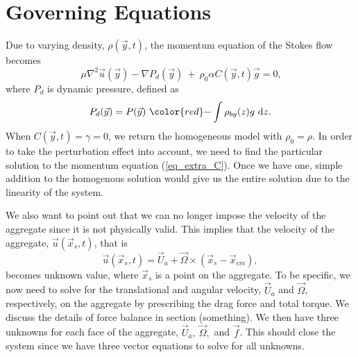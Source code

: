 \section{Governing Equations}
	Due to varying density, $\rho(\vec{y}, t)$, 
the momentum equation of the Stokes flow becomes
		 \begin{equation}
		\ \mu \nabla^2 \vec{u}(\vec{y})
		- \nabla P_d (\vec{y}) \ + \  
		 \rho_0 \alpha C(\vec{y},t) \vec{g} =0 , 
	\label{eq_extra_C}
	\end{equation}
	where $P_d$ is dynamic pressure, defined as
\begin{equation}
	P_d (\vec{y})
	 = P (\vec{y}) \ {\color{red}-} \int \rho_{bg}(z) g  \ \textrm{d}z.
	\label{eq_Pd}
\end{equation}
	When $C(\vec{y}, t)= \gamma = 0$, we return the homogeneous model with $\rho_0 = \rho$. 
	 In order to take the perturbation effect into account, we need to find the particular solution to the momentum equation (\ref{eq_extra_C}). Once we have one, simple addition to the homogenous solution would give us the entire solution due to the linearity of the system. 
\par
We also want to point out that we can no longer impose the velocity of the aggregate since it is not physically valid.
This implies that the velocity of the aggregate, $\vec{u}(\vec{x}_s, t)$, that is
\begin{equation}
	\vec{u} (\vec{x}_s, t)  = \vec{U}_a + \vec{\Omega} \times (\vec{x}_s - \vec{x}_{cm}),
\end{equation}
becomes unknown value, where $\vec{x}_s$ is a point on the aggregate. To be specific, we now need to solve for the translational and angular velocity, $\vec{U}_a$ and $\vec{\Omega}$, respectively, on the aggregate by prescribing the drag force and total torque. We discuss the details of force balance in section (something).
We then have three unknowns for each face of the aggregate, $\vec{U}_a, \ \vec{\Omega}, $ and $\vec{f}$.
This should close the system since we have three vector equations to solve for all unknowns. 


